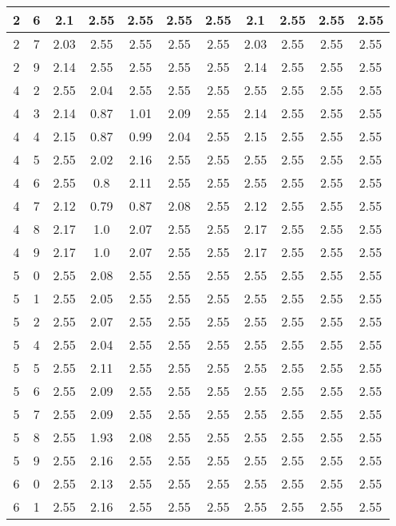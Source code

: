 \begin{longtable}{|c|c||c||c|c|c|c||c|c|c|c|}
	2 & 6 & 2.1 & 2.55 & 2.55 & 2.55 & 2.55 & 2.1 & 2.55 & 2.55 & 2.55 \\ \hline
	2 & 7 & 2.03 & 2.55 & 2.55 & 2.55 & 2.55 & 2.03 & 2.55 & 2.55 & 2.55 \\ \hline
	2 & 9 & 2.14 & 2.55 & 2.55 & 2.55 & 2.55 & 2.14 & 2.55 & 2.55 & 2.55 \\ \hline
	4 & 2 & 2.55 & 2.04 & 2.55 & 2.55 & 2.55 & 2.55 & 2.55 & 2.55 & 2.55 \\ \hline
	4 & 3 & 2.14 & 0.87 & 1.01 & 2.09 & 2.55 & 2.14 & 2.55 & 2.55 & 2.55 \\ \hline
	4 & 4 & 2.15 & 0.87 & 0.99 & 2.04 & 2.55 & 2.15 & 2.55 & 2.55 & 2.55 \\ \hline
	4 & 5 & 2.55 & 2.02 & 2.16 & 2.55 & 2.55 & 2.55 & 2.55 & 2.55 & 2.55 \\ \hline
	4 & 6 & 2.55 & 0.8 & 2.11 & 2.55 & 2.55 & 2.55 & 2.55 & 2.55 & 2.55 \\ \hline
	4 & 7 & 2.12 & 0.79 & 0.87 & 2.08 & 2.55 & 2.12 & 2.55 & 2.55 & 2.55 \\ \hline
	4 & 8 & 2.17 & 1.0 & 2.07 & 2.55 & 2.55 & 2.17 & 2.55 & 2.55 & 2.55 \\ \hline
	4 & 9 & 2.17 & 1.0 & 2.07 & 2.55 & 2.55 & 2.17 & 2.55 & 2.55 & 2.55 \\ \hline
	5 & 0 & 2.55 & 2.08 & 2.55 & 2.55 & 2.55 & 2.55 & 2.55 & 2.55 & 2.55 \\ \hline
	5 & 1 & 2.55 & 2.05 & 2.55 & 2.55 & 2.55 & 2.55 & 2.55 & 2.55 & 2.55 \\ \hline
	5 & 2 & 2.55 & 2.07 & 2.55 & 2.55 & 2.55 & 2.55 & 2.55 & 2.55 & 2.55 \\ \hline
	5 & 4 & 2.55 & 2.04 & 2.55 & 2.55 & 2.55 & 2.55 & 2.55 & 2.55 & 2.55 \\ \hline
	5 & 5 & 2.55 & 2.11 & 2.55 & 2.55 & 2.55 & 2.55 & 2.55 & 2.55 & 2.55 \\ \hline
	5 & 6 & 2.55 & 2.09 & 2.55 & 2.55 & 2.55 & 2.55 & 2.55 & 2.55 & 2.55 \\ \hline
	5 & 7 & 2.55 & 2.09 & 2.55 & 2.55 & 2.55 & 2.55 & 2.55 & 2.55 & 2.55 \\ \hline
	5 & 8 & 2.55 & 1.93 & 2.08 & 2.55 & 2.55 & 2.55 & 2.55 & 2.55 & 2.55 \\ \hline
	5 & 9 & 2.55 & 2.16 & 2.55 & 2.55 & 2.55 & 2.55 & 2.55 & 2.55 & 2.55 \\ \hline
	6 & 0 & 2.55 & 2.13 & 2.55 & 2.55 & 2.55 & 2.55 & 2.55 & 2.55 & 2.55 \\ \hline
	6 & 1 & 2.55 & 2.16 & 2.55 & 2.55 & 2.55 & 2.55 & 2.55 & 2.55 & 2.55 \\ \hline

\end{longtable}
